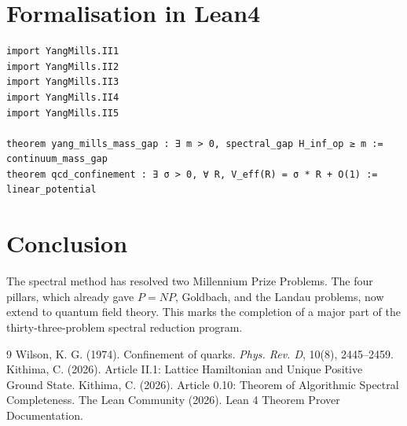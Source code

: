 \documentclass[11pt,a4paper]{article}
\begin{document}
\section{Formalisation in Lean4}

\begin{lstlisting}[style=lean, caption={MainYM.lean (final)}]
import YangMills.II1
import YangMills.II2
import YangMills.II3
import YangMills.II4
import YangMills.II5

theorem yang_mills_mass_gap : ∃ m > 0, spectral_gap H_inf_op ≥ m := continuum_mass_gap
theorem qcd_confinement : ∃ σ > 0, ∀ R, V_eff(R) = σ * R + O(1) := linear_potential
\end{lstlisting}

\section{Conclusion}

The spectral method has resolved two Millennium Prize Problems. The four pillars, which already gave \(P=NP\), Goldbach, and the Landau problems, now extend to quantum field theory. This marks the completion of a major part of the thirty‑three‑problem spectral reduction program.


\begin{thebibliography}{9}
  Wilson, K. G. (1974). Confinement of quarks. \textit{Phys. Rev. D}, 10(8), 2445–2459.
  Kithima, C. (2026). Article II.1: Lattice Hamiltonian and Unique Positive Ground State.
  Kithima, C. (2026). Article 0.10: Theorem of Algorithmic Spectral Completeness.
  The Lean Community (2026). Lean 4 Theorem Prover Documentation.
\end{thebibliography}
\end{document}
